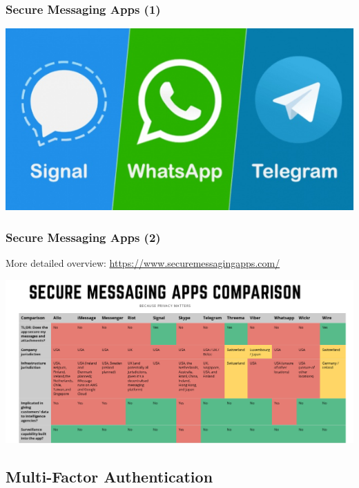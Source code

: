 \documentclass[aspectratio=169,dvipsnames]{beamer}
\begin{document}
\begin{frame}
\frametitle{Secure Messaging Apps (1)}
\begin{center}
\includegraphics[scale=0.5]{images/signal_whatsapp_telegram.png} 
\end{center}
\end{frame}

\begin{frame}
\frametitle{Secure Messaging Apps (2)}
\begin{center}
More detailed overview: \url{https://www.securemessagingapps.com/}
\bigskip

\includegraphics[scale=0.25, keepaspectratio]{images/secure_messengers_comparison.png} 
\end{center}
\end{frame}

\subsection{Multi-Factor Authentication}
\end{document}
